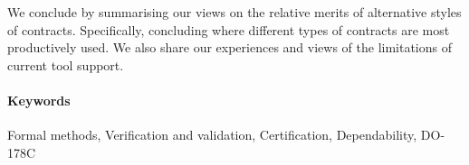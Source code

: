 \documentclass{llncs}
\begin{document}
We conclude by summarising our views on the relative merits of
alternative styles of contracts. Specifically, concluding where
different types of contracts are most productively used. We also 
share our experiences and views of the limitations of current tool
support.



\paragraph{Keywords}
Formal methods, Verification and validation, Certification,
Dependability, DO-178C




\end{document}
